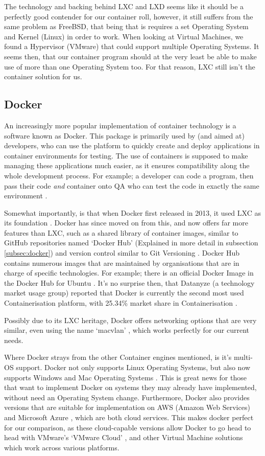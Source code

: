 The technology and backing behind LXC and LXD seems like it should be a perfectly good contender for our container roll, however, it still suffers from the same problem as FreeBSD, that being that is requires a set Operating System and Kernel (Linux) in order to work. When looking at Virtual Machines, we found a Hypervisor (VMware) that could support multiple Operating Systems. It seems then, that our container program should at the very least be able to make use of more than one Operating System too. For that reason, LXC still isn't the container solution for us.

\subsection{Docker}
\label{DockerAnalysisBit}
An increasingly more popular implementation of container technology is a software known as Docker. This package is primarily used by (and aimed at) developers, who can use the platform to quickly create and deploy applications in container environments for testing. The use of containers is supposed to make managing these applications much easier, as it ensures compatibility along the whole development process. For example; a developer can code a program, then pass their code \emph{and} container onto QA who can test the code in exactly the same environment \citep{whydocker}.

Somewhat importantly, is that when Docker first released in 2013, it used LXC as its foundation \citep{ContainerHistory}. Docker has since moved on from this, and now offers far more features than LXC, such as a shared library of container images, similar to GitHub repositories named `Docker Hub' (Explained in more detail in subsection \ref{subsec:docker}) and version control similar to Git Versioning \citep{DockerBetter}. Docker Hub contains numerous images that are maintained by organisations that are in charge of specific technologies. For example; there is an official Docker Image in the Docker Hub for Ubuntu \citep{UbuntuDockerHub}. It's no surprise then, that Datanyze (a technology market usage group) reported that Docker is currently the second most used Containerisation platform, with 25.34\% market share in Containerisation \citep{datanyze}.

Possibly due to its LXC heritage, Docker offers networking options that are very similar, even using the name `macvlan' \citep{DockerMacVlan}, which works perfectly for our current needs.

Where Docker strays from the other Container engines mentioned, is it's multi-OS support. Docker not only supports Linux Operating Systems, but also now supports Windows and Mac Operating Systems \citep{DockerEditions}. This is great news for those that want to implement Docker on systems they may already have implemented, without need an Operating System change. Furthermore, Docker also provides versions that are suitable for implementation on AWS (Amazon Web Services) and Microsoft Azure \citep{DockerEditions}, which are both cloud services. This makes docker perfect for our comparison, as these cloud-capable versions allow Docker to go head to head with VMware's `VMware Cloud' \citep{VMwareCloud}, and other Virtual Machine solutions which work across various platforms.

